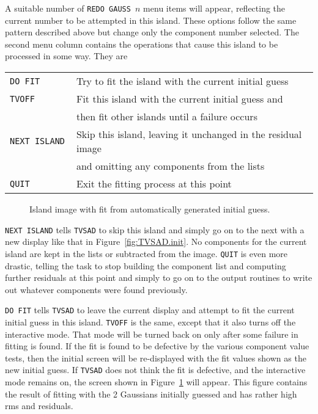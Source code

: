 \documentclass[twoside]{article}
\newcommand{\putfig}[1]{\texttt{[image: \#1.eps]}}
\begin{document}
A suitable number of {\tt REDO GAUSS $n$} menu items will appear,
reflecting the current number to be attempted in this island.  These
options follow the same pattern described above but change only the
component number selected.  The second menu column contains the
operations that cause this island to be processed in some way.  They
are

\begin{center}
\begin{tabular}{|l|l|}\hline
 {\tt DO FIT      } & Try to fit the island with the current initial
                      guess \\
 {\tt TVOFF       } & Fit this island with the current initial guess
                      and \\
 {\tt             } & then fit other islands until a failure
                      occurs \\
 {\tt NEXT ISLAND } & Skip this island, leaving it unchanged in the
                      residual image\\
 {\tt             } & and omitting any components from the lists \\
 {\tt QUIT        } & Exit the fitting process at this point \\ \hline
\end{tabular}
\end{center}

\begin{figure}
\begin{center}
\resizebox{6.0in}{!}{\putfig{TVSAD.2}}
\caption{Island image with fit from automatically generated initial
  guess.}
\label{fig:TVSAD.badfit}
\end{center}
\end{figure}

{\tt NEXT ISLAND} tells {\tt TVSAD} to skip this island and simply go
on to the next with a new display like that in
Figure~\ref{fig:TVSAD.init}.  No components for the current island are
kept in the lists or subtracted from the image.  {\tt QUIT} is even
more drastic, telling the task to stop building the component list and
computing further residuals at this point and simply to go on to the
output routines to write out whatever components were found
previously.

{\tt DO FIT} tells {\tt TVSAD} to leave the current display and
attempt to fit the current initial guess in this island.  {\tt TVOFF}
is the same, except that it also turns off the interactive mode.  That
mode will be turned back on only after some failure in fitting is
found.  If the fit is found to be defective by the various component
value tests, then the initial screen will be re-displayed with the fit
values shown as the new initial guess.  If {\tt TVSAD} does not think
the fit is defective, and the interactive mode remains on, the screen
shown in Figure~\ref{fig:TVSAD.badfit} will appear.  This figure
contains the result of fitting with the 2 Gaussians initially guessed
and has rather high rms and residuals.
\end{document}
